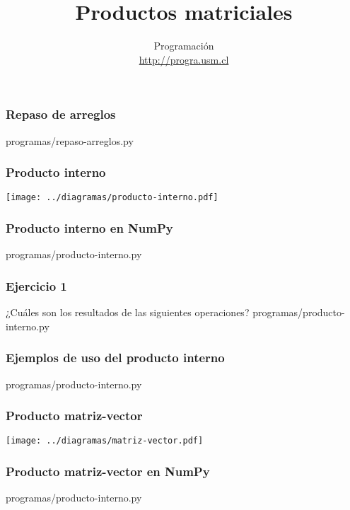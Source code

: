\documentclass[12pt]{beamer}
\title{Productos matriciales}
\author{
  Programación \\ \url{http://progra.usm.cl}
}
\date{}
\begin{document}
  \begin{frame}
    \maketitle
  \end{frame}

  \begin{frame}
    \label{repaso-arreglos}
    \frametitle{Repaso de arreglos}
        {programas/repaso-arreglos.py}
  \end{frame}

  \begin{frame}
    \label{producto-interno}
    \frametitle{Producto interno}
    \texttt{[image: ../diagramas/producto-interno.pdf]}
  \end{frame}

  \begin{frame}
    \label{producto-interno-numpy}
    \frametitle{Producto interno en NumPy}
    
        {programas/producto-interno.py}
  \end{frame}

  \begin{frame}
    \label{ejercicios-producto-interno}
    \frametitle{Ejercicio 1}
    ¿Cuáles son los resultados
    de las siguientes operaciones?
        {programas/producto-interno.py}
  \end{frame}

  \begin{frame}
    \label{ejemplos-producto-interno}
    \frametitle{Ejemplos de uso del producto interno}
        {programas/producto-interno.py}
  \end{frame}

  \begin{frame}
    \label{producto-matriz-vector}
    \frametitle{Producto matriz-vector}
    \texttt{[image: ../diagramas/matriz-vector.pdf]}
  \end{frame}

  \begin{frame}
    \label{producto-matriz-vector-numpy}
    \frametitle{Producto matriz-vector en NumPy}
    
        {programas/producto-interno.py}
  \end{frame}
\end{document}
